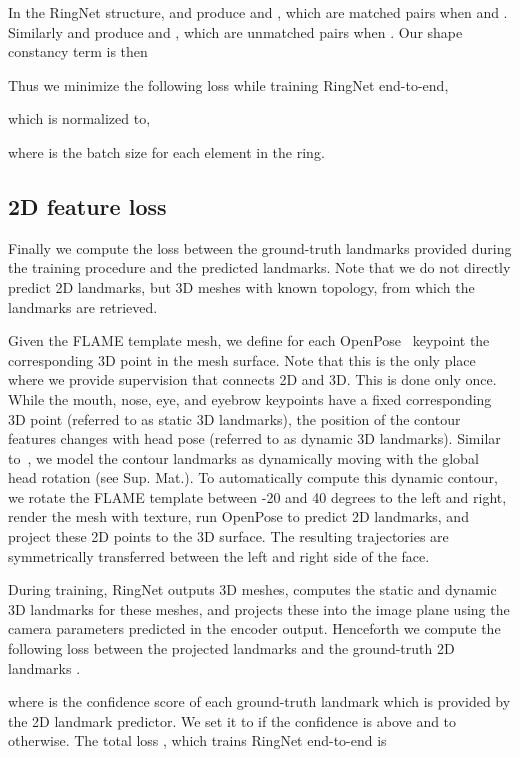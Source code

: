 In the RingNet structure,  and  produce  and , which are matched pairs when  and .
Similarly  and  produce  and , which are unmatched pairs when .
Our shape constancy term is then

Thus we minimize the following loss while training RingNet end-to-end, 

which is normalized to,

where  is the batch size for each element in the ring. 


\subsection{2D feature loss}

Finally we compute the  loss between the ground-truth landmarks provided during the training procedure and the predicted landmarks. Note that we do not directly predict 2D landmarks, but 3D meshes with known topology, from which the landmarks are retrieved.

Given the FLAME template mesh, we define for each OpenPose~\cite{simon2017hand} keypoint the corresponding 3D point in the mesh surface.
Note that this is the only place where we provide supervision that connects 2D and 3D. 
This is done only once.
While the mouth, nose, eye, and eyebrow keypoints have a fixed corresponding 3D point (referred to as static 3D landmarks), the position of the contour features changes with head pose (referred to as dynamic 3D landmarks).
Similar to~\cite{Cao:2014,Tewari2}, we model the contour landmarks as dynamically moving with the global head rotation (see Sup. Mat.). 
To automatically compute this dynamic contour, we rotate the FLAME template between -20 and 40 degrees to the left and right, render the mesh with texture, run OpenPose to predict 2D landmarks, and project these 2D points to the 3D surface. 
The resulting trajectories are symmetrically transferred between the left and right side of the face.


During training, RingNet outputs 3D meshes, computes the static and dynamic 3D landmarks for these meshes, and projects these into the image plane using the camera parameters predicted in the encoder output.
Henceforth we compute the following  loss between the projected landmarks  and the ground-truth 2D landmarks .
 
where  is the confidence score of each ground-truth landmark which is provided by the 2D landmark predictor. We set it to  if the confidence is above  and to  otherwise.
The total loss , which trains RingNet end-to-end is

